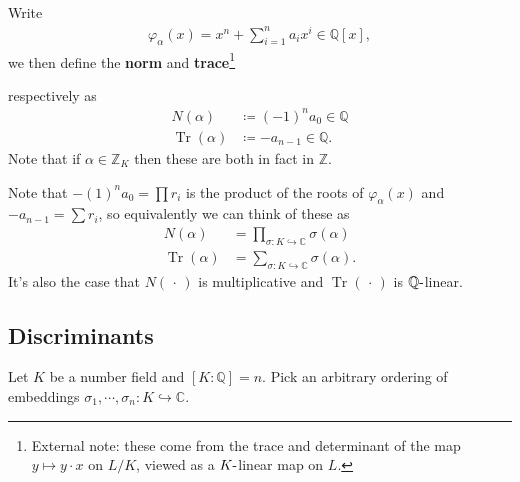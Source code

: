 \begin{definition}

Write
\begin{align*}
\varphi_{ \alpha} (x) = x^n + \sum_{i=1}^n a_i x^i \in {\mathbb{Q}}[x]
,\end{align*}
we then define the \textbf{norm} and \textbf{trace}\footnote{External
  note: these come from the trace and determinant of the map
  \(y \mapsto y\cdot x\) on \(L/K\), viewed as a \(K{\hbox{-}}\)linear
  map on \(L\).}

respectively as
\begin{align*}
N( \alpha) &\coloneqq(-1)^n a_0 \in {\mathbb{Q}}\\
\operatorname{Tr}( \alpha) &\coloneqq-a_{n-1} \in {\mathbb{Q}}
.\end{align*}
Note that if \(\alpha \in {\mathbb{Z}}_K\) then these are both in fact
in \({\mathbb{Z}}\).

\end{definition}

\begin{remark}

Note that \(-(1)^n a_0 = \prod r_i\) is the product of the roots of
\(\varphi_{ \alpha} (x)\) and \(-a_{n-1} = \sum r_i\), so equivalently
we can think of these as
\begin{align*}
N( \alpha ) &= \prod_{ \sigma: K \hookrightarrow{\mathbb{C}}} \sigma( \alpha) \\
\operatorname{Tr}( \alpha ) &= \sum_{\sigma: K \hookrightarrow{\mathbb{C}}} \sigma( \alpha) 
.\end{align*}
It's also the case that \(N({\,\cdot\,})\) is multiplicative and
\(\operatorname{Tr}({\,\cdot\,})\) is \({\mathbb{Q}}{\hbox{-}}\)linear.

\end{remark}

\hypertarget{discriminants}{%
\subsection{Discriminants}\label{discriminants}}

\begin{remark}

Let \(K\) be a number field and \([K : {\mathbb{Q}}] = n\). Pick an
arbitrary ordering of embeddings
\(\sigma_1, \cdots, \sigma_n: K \hookrightarrow{\mathbb{C}}\).

\end{remark}

